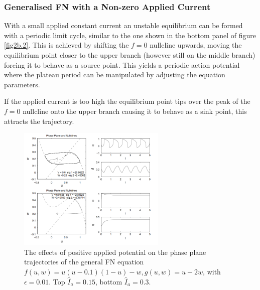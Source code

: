     \subsubsection{Generalised FN with a Non-zero Applied Current}
    With a small applied constant current an unstable equilibrium can be formed with a periodic limit cycle, similar to the one shown in the bottom panel of figure \ref{fig2b.2}. This is achieved by shifting the $f=0$ nullcline upwards, moving the equilibrium point closer to the upper branch (however still on the middle branch) forcing it to behave as a source point. This yields a periodic action potential where the plateau period can be manipulated by adjusting the equation parameters. \par
    If the applied current is too high the equilibrium point tips over the peak of the $f=0$ nullcline onto the upper branch causing it to behave as a sink point, this attracts the trajectory.
    \begin{figure}
        \centering
        \includegraphics[width=0.63\textwidth]{images/Iposcycles.png}
        \caption{The effects of positive applied potential on the phase plane trajectories of the general FN equation $f(u,w)=u(u-0.1)(1-u)-w, g(u,w)=u-2w$, with $\epsilon=0.01$. Top $\hat I_a = 0.15$, bottom $\hat I_a =0.3$. \citep{ecg}}
        \label{fig2b.3}
    \end{figure}
